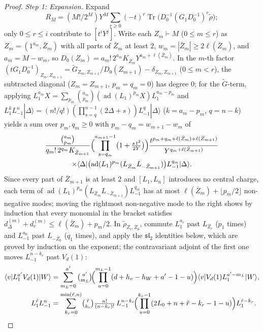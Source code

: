 \documentclass[twoside,10pt]{article}
\numberwithin{equation}{section}
\theoremstyle{slbody}
\theoremstyle{definition}
\theoremstyle{remark}
\newcommand{\Tr}{\operatorname{Tr}}
\begin{document}
\begin{proof}
\emph{Step 1: Expansion.}  Expand
\[
 R_M=(M!/2^M)Y^M\sum_{r\geq0}(-t)^r\Tr\bigl(D_0^{-1}(G_1D_0^{-1})^r\widetilde\rho\bigr);
\]
only \(0\leq r\leq i\) contribute to \([t^iY^j]\).  Write each
\(Z_m\vdash M\) (\(0\leq m\leq r\)) as \(Z_m=(1^{a_m},\bar Z_m)\)
with all parts of \(\bar Z_m\) at least \(2\), \(w_m=|\bar Z_m|\geq2\ell(\bar Z_m)\),
and \(a_m=M-w_m\), so
\(D_0(Z_m)=a_m!\,2^{a_m}K_{\bar Z_m}Y^{a_m+\ell(\bar Z_m)}\).  In the
\(m\)-th factor
\((tG_1D_0^{-1})_{Z_m,Z_{m+1}}=\widetilde G_{Z_m,Z_{m+1}}/D_0(Z_{m+1})-\delta_{Z_m,Z_{m+1}}\)
(\(0\leq m<r\)), the subtracted diagonal (\(Z_m=Z_{m+1}\),
\(p_m=q_m=0\)) has degree \(0\); for the \(\widetilde G\)-term, applying
\(L_1^{a_m}X=\sum_{p_m}\binom{a_m}{p_m}(\operatorname{ad}(L_1)^{p_m}X)L_1^{a_m-p_m}\)
and \(L_1^kL_{-1}^n|\Delta\rangle=(n!/q!)(\prod_{s=q}^{n-1}(2\Delta+s))L_{-1}^q|\Delta\rangle\)
(\(k=a_m-p_m\), \(q=n-k\)) yields a sum over \(p_m,q_m\geq0\) with
\(p_m-q_m=w_{m+1}-w_m\) of
\begin{multline*}
 \frac{\binom{a_m}{p_m}}{q_m!\,2^{q_m}K_{\bar Z_{m+1}}}
 \Bigl(\prod_{s=q_m}^{a_{m+1}-1}\bigl(1+\tfrac{s\,t^2}{2Y}\bigr)\Bigr)
 \frac{t^{p_m+q_m+\ell(\bar Z_m)+\ell(\bar Z_{m+1})}}{Y^{q_m+\ell(\bar Z_{m+1})}}\\
 \times\langle\Delta|\bigl(\operatorname{ad}(L_1)^{p_m}(L_{\bar Z_m}L_{-\bar Z_{m+1}})\bigr)L_{-1}^{q_m}|\Delta\rangle.
\end{multline*}
Since every part of \(\bar Z_{m+1}\) is at least \(2\) and \([L_1,L_n]\)
introduces no central charge, each term of
\(\operatorname{ad}(L_1)^{p_m}(L_{\bar Z_m}L_{-\bar Z_{m+1}})L_{-1}^{q_m}\) has at
most \(\ell(\bar Z_m)+\lfloor p_m/2\rfloor\) non-negative modes; moving the
rightmost non-negative mode to the right shows by induction that every
monomial in the bracket satisfies
\(d_\Delta^{(m)}+d_c^{(m)}\leq\ell(\bar Z_m)+p_m/2\).  In
\(\widetilde\rho_{Z_r,Z_0}\), commute \(L_1^{a_r}\) past
\(L_{\bar Z_r}\) (\(p_1\) times) and \(L_{-1}^{a_0}\) past \(L_{-\bar Z_0}\)
(\(q_1\) times), and apply the \(\mathfrak{sl}_2\) identities below, which
are proved by induction on the exponent; the contravariant adjoint of the
first one moves \(L_{-1}^{n-k_r}\) past \(V_d(1)\):
\begin{align*}
 \langle v|L_1^{a'}V_d(1)|W\rangle
 &=\sum_{m_L=0}^{a'}\tbinom{a'}{m_L}\!\Bigl(\prod_{u=0}^{m_L-1}(d+h_v-h_W+a'-1-u)\Bigr)
   \langle v|V_d(1)L_1^{a'-m_L}|W\rangle,\\
 L_1^{\tilde r}L_{-1}^{n}
 &=\sum_{k_r=0}^{\min(\tilde r,n)}\!\tbinom{\tilde r}{k_r}\tfrac{n!}{(n-k_r)!}\,
   L_{-1}^{n-k_r}\!\Bigl(\prod_{u=0}^{k_r-1}(2L_0+n+\tilde r-k_r-1-u)\Bigr)L_1^{\tilde r-k_r}.

\end{align*}
\end{proof}
\end{document}
